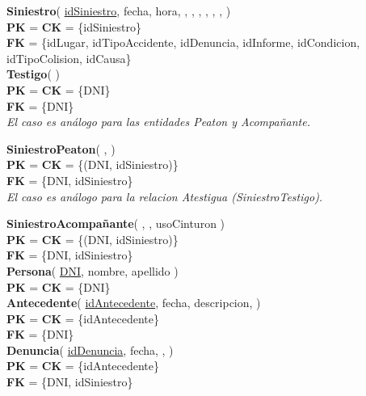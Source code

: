 \textbf{Siniestro}(
    \uline{idSiniestro},
    fecha,
    hora,
    ,
    ,
    ,
    ,
    ,
    ,
)\\
\textbf{PK} = \textbf{CK} = \{idSiniestro\}\\
\textbf{FK} = \{idLugar, idTipoAccidente, idDenuncia, idInforme, idCondicion, idTipoColision, idCausa\}\\

\textbf{Testigo}(
)\\
\textbf{PK} = \textbf{CK} = \{DNI\}\\
\textbf{FK} = \{DNI\}\\
\textit{El caso es análogo para las entidades Peaton y Acompañante.}

\textbf{SiniestroPeaton}(
    ,
)\\
\textbf{PK} = \textbf{CK} = \{(DNI, idSiniestro)\}\\
\textbf{FK} = \{DNI, idSiniestro\}\\
\textit{El caso es análogo para la relacion Atestigua (SiniestroTestigo).}

\textbf{SiniestroAcompañante}(
    ,
    ,
    usoCinturon
)\\
\textbf{PK} = \textbf{CK} = \{(DNI, idSiniestro)\}\\
\textbf{FK} = \{DNI, idSiniestro\}\\

\textbf{Persona}(
    \uline{DNI},
    nombre,
    apellido
)\\
\textbf{PK} = \textbf{CK} = \{DNI\}\\

\textbf{Antecedente}(
    \uline{idAntecedente},
    fecha,
    descripcion,
)\\
\textbf{PK} = \textbf{CK} = \{idAntecedente\}\\
\textbf{FK} = \{DNI\}\\

\textbf{Denuncia}(
    \uline{idDenuncia},
    fecha,
    ,
)\\
\textbf{PK} = \textbf{CK} = \{idAntecedente\}\\
\textbf{FK} = \{DNI, idSiniestro\}\\


